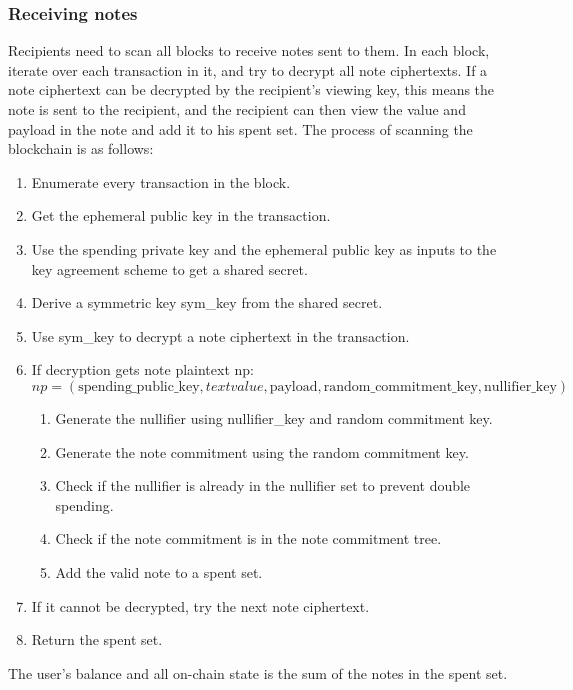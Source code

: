 \subsubsection{Receiving notes}\label{section: receiving-notes}

Recipients need to scan all blocks to receive notes sent to them. In each block, iterate over each transaction in it, and try to decrypt all note ciphertexts. If a note ciphertext can be decrypted by the recipient's viewing key, this means the note is sent to the recipient, and the recipient can then view the value and payload in the note and add it to his spent set. The process of scanning the blockchain is as follows:

\begin{enumerate}
    \item Enumerate every transaction in the block.
    \item Get the ephemeral public key in the transaction.
    \item Use the spending private key and the ephemeral public key as inputs to the key agreement scheme to get a shared secret.
    \item Derive a symmetric key sym\_key from the shared secret.
    \item Use sym\_key to decrypt a note ciphertext in the transaction.
    \item If decryption gets note plaintext np: 
        $$np = (\text{spending\_public\_key}, text{value}, \text{payload}, \text{random\_commitment\_key}, \text{nullifier\_key})$$
        \begin{enumerate}
            \item Generate the nullifier using nullifier\_key and random commitment key.
            \item Generate the note commitment using the random commitment key.
            \item Check if the nullifier is already in the nullifier set to prevent double spending.
            \item Check if the note commitment is in the note commitment tree.
            \item Add the valid note to a spent set.
        \end{enumerate}
    \item If it cannot be decrypted, try the next note ciphertext.
    \item Return the spent set.
\end{enumerate}

The user's balance and all on-chain state is the sum of the notes in the spent set.
